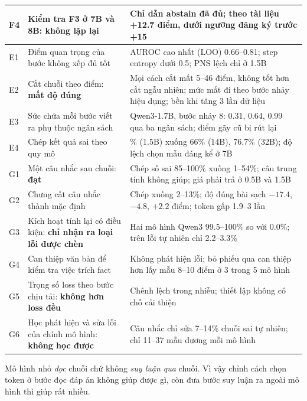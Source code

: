 \documentclass[11pt]{article}
\begin{document}
\begin{table}[h]
\begin{tabularx}{\linewidth}{@{}l>{\raggedright\arraybackslash}X>{\raggedright\arraybackslash}X@{}}
F4 & Kiểm tra F3 ở 7B và 8B: \textcolor{doxam}{\textbf{không lặp lại}}
   & Chỉ dẫn abstain đã đủ; theo tài liệu +12.7 điểm, dưới ngưỡng đăng ký trước +15 \\
\midrule
E1 & Điểm quan trọng của bước không xếp đủ tốt
   & AUROC cao nhất (LOO) 0.66--0.81; step entropy dưới 0.5; PNS lệch chỉ ở 1.5B \\
E2 & Cắt chuỗi theo điểm: \textcolor{doxam}{\textbf{mất độ đúng}}
   & Mọi cách cắt mất 5--46 điểm, không tốt hơn cắt ngẫu nhiên; mức mất đi theo bước nhảy hiệu dụng; bền khi tăng 3 lần dữ liệu \\
E3 & Sức chứa mỗi bước viết ra phụ thuộc ngân sách
   & Qwen3-1.7B, bước nhảy 8: 0.31, 0.64, 0.99 qua ba ngân sách; điểm gãy cũ bị rút lại \\
E4 & Chép kết quả sai theo quy mô
   & 99.5\% (1.5B) xuống 66\% (14B), 76.7\% (32B); độ lệch chọn mẫu đáng kể ở 7B \\
\midrule
G1 & Một câu nhắc sau chuỗi: \textcolor{luc}{\textbf{đạt}}
   & Chép số sai 85--100\% xuống 1--54\%; câu trung tính không giúp; giá phải trả ở 0.5B và 1.5B \\
G2 & Chưng cất câu nhắc thành mặc định
   & Chép xuống 2--13\%; độ đúng bài sạch $-17.4$, $-4.8$, $+2.2$ điểm; token gấp 1.9--3 lần \\
G3 & Kích hoạt tính lại có điều kiện: \textcolor{doxam}{\textbf{chỉ nhận ra loại lỗi được chèn}}
   & Hai mô hình Qwen3 99.5--100\% so với 0.0\%; trên lỗi tự nhiên chỉ 2.2--3.3\% \\
G4 & Can thiệp văn bản để kiểm tra việc trích fact
   & Không phát hiện lỗi; bỏ phiếu qua can thiệp hơn lấy mẫu 8--10 điểm ở 3 trong 5 mô hình \\
G5 & Trọng số loss theo bước chịu tải: \textcolor{doxam}{\textbf{không hơn loss đều}}
   & Chênh lệch trong nhiễu; thiết lập không có chỗ cải thiện \\
G6 & Học phát hiện và sửa lỗi của chính mô hình: \textcolor{doxam}{\textbf{không học được}}
   & Câu nhắc chỉ sửa 7--14\% chuỗi sai tự nhiên; chỉ 11--37 mẫu dương mỗi mô hình \\
\bottomrule
\end{tabularx}
\end{table}

\begin{ketluan}
Mô hình nhỏ \emph{đọc} chuỗi chứ không \emph{suy luận qua} chuỗi. Vì vậy chỉnh cách chọn token ở
bước đọc đáp án không giúp được gì, còn đưa bước suy luận ra ngoài mô hình thì giúp rất nhiều.
\end{ketluan}
\end{document}
